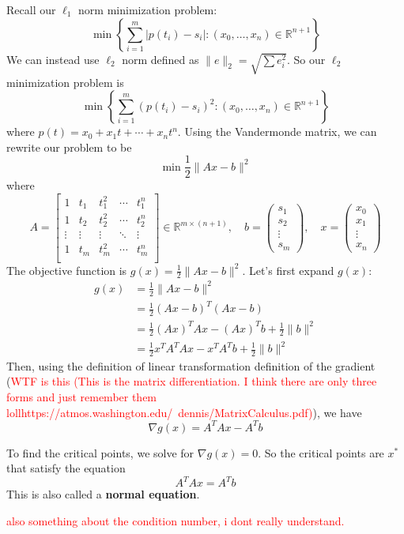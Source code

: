 \begin{problem}
  Recall our $\ell_1$ norm minimization problem:
  $$\min \left\{\sum^m_{i=1}|p(t_i) - s_i| : (x_0,\ldots,x_n) \in \mathbb R^{n+1}\right\}$$
  We can instead use $\ell_2$ norm defined as $\|e\|_2 = \sqrt{\sum e_i^2}$. So our $\ell_2$ minimization problem is $$\min \left\{\sum^m_{i=1}(p(t_i) - s_i)^2 : (x_0,\ldots,x_n) \in \mathbb R^{n+1}\right\}$$ where $p(t) = x_0 + x_1t + \cdots + x_nt^n$. Using the Vandermonde matrix, we can rewrite our problem to be
  $$\min \frac{1}{2} \|Ax - b\|^2$$ where $$A = \begin{bmatrix}
    1 & t_1 & t_1^2 & \cdots & t_1^n\\
    1 & t_2 & t_2^2 & \cdots & t_2^n\\
    \vdots & \vdots & \vdots & \ddots & \vdots\\
    1 & t_m & t_m^2 & \cdots & t_m^n\\
  \end{bmatrix} \in \mathbb R^{m \times (n+1)}, \quad b = \begin{pmatrix}
    s_1 \\ s_2 \\ \vdots \\ s_m
  \end{pmatrix}, \quad x = \begin{pmatrix}
    x_0 \\ x_1 \\ \vdots \\ x_n
  \end{pmatrix}$$
  The objective function is $g(x) = \frac{1}{2}\|Ax - b\|^2$. Let's first expand $g(x)$:
  \begin{align*}
    g(x) &= \frac{1}{2} \|Ax - b \|^2 \\
    &= \frac{1}{2}(Ax - b)^T (Ax - b) \\
    &= \frac{1}{2} (Ax)^T Ax - (Ax)^Tb + \frac{1}{2} \|b \|^2 \\
    &= \frac{1}{2} x^T A^T Ax - x^T A^T b + \frac{1}{2} \|b \|^2 
  \end{align*}
  Then, using the definition of linear transformation definition of the gradient (\textcolor{red}{WTF is this (This is the matrix differentiation. I think there are only three forms and just remember them lollhttps://atmos.washington.edu/~dennis/MatrixCalculus.pdf)}), we have $$\nabla g(x) = A^T Ax - A^T b$$
  
  To find the critical points, we solve for $\nabla g(x) = 0$. So the critical points are $x^*$ that satisfy the equation
  $$A^TAx = A^Tb$$
  This is also called a \textbf{normal equation}.

  \textcolor{red}{also something about the condition number, i dont really understand.}
\end{problem}
